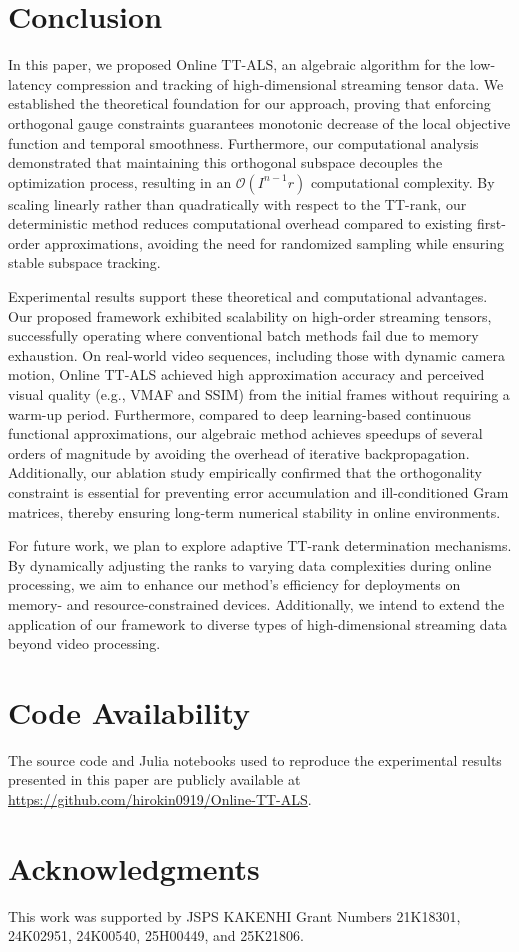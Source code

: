 \documentclass[a4paper, 11pt]{article}
\theoremstyle{plain}
\theoremstyle{definition}
\theoremstyle{remark}
\begin{document}
\section{Conclusion}
\label{sec:conclusion}
In this paper, we proposed Online TT-ALS, an algebraic algorithm for the low-latency compression and tracking of high-dimensional streaming tensor data.
We established the theoretical foundation for our approach, proving that enforcing orthogonal gauge constraints guarantees monotonic decrease of the local objective function and temporal smoothness.
Furthermore, our computational analysis demonstrated that maintaining this orthogonal subspace decouples the optimization process, resulting in an $\mathcal{O}(I^{n-1} r)$ computational complexity.
By scaling linearly rather than quadratically with respect to the TT-rank, our deterministic method reduces computational overhead compared to existing first-order approximations, avoiding the need for randomized sampling while ensuring stable subspace tracking.

Experimental results support these theoretical and computational advantages.
Our proposed framework exhibited scalability on high-order streaming tensors, successfully operating where conventional batch methods fail due to memory exhaustion.
On real-world video sequences, including those with dynamic camera motion, Online TT-ALS achieved high approximation accuracy and perceived visual quality (e.g., VMAF and SSIM) from the initial frames without requiring a warm-up period.
Furthermore, compared to deep learning-based continuous functional approximations, our algebraic method achieves speedups of several orders of magnitude by avoiding the overhead of iterative backpropagation.
Additionally, our ablation study empirically confirmed that the orthogonality constraint is essential for preventing error accumulation and ill-conditioned Gram matrices, thereby ensuring long-term numerical stability in online environments.

For future work, we plan to explore adaptive TT-rank determination mechanisms.
By dynamically adjusting the ranks to varying data complexities during online processing, we aim to enhance our method's efficiency for deployments on memory- and resource-constrained devices.
Additionally, we intend to extend the application of our framework to diverse types of high-dimensional streaming data beyond video processing.

\section*{Code Availability}
The source code and Julia notebooks used to reproduce the experimental results presented in this paper are publicly available at \url{https://github.com/hirokin0919/Online-TT-ALS}.

\section*{Acknowledgments}
This work was supported by JSPS KAKENHI Grant Numbers 21K18301, 24K02951, 24K00540, 25H00449, and 25K21806.



\end{document}
